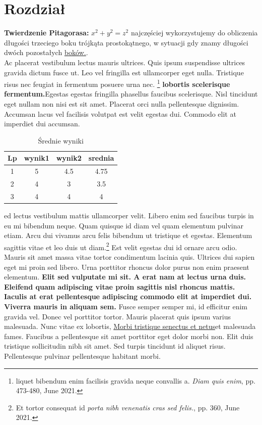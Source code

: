 \documentclass[12pt,a4paper]{article}
\begin{document}
	\section{Rozdział}
	\textbf{Twierdzenie Pitagorasa:} \(x^2 + y^2 = z^2\) najczęściej wykorzystujemy do obliczenia długości trzeciego boku trójkąta prostokątnego, w sytuacji gdy znamy długości dwóch pozostałych \underline{boków.}.
	\\Ac placerat vestibulum lectus mauris ultrices. Quis ipsum suspendisse ultrices gravida dictum fusce ut. Leo vel fringilla est ullamcorper eget nulla. Tristique risus nec feugiat in fermentum posuere urna nec. \footnote{liquet bibendum enim facilisis gravida neque convallis a. \emph{Diam quis enim}, pp. 473-480, June 2021.} \textbf{lobortis scelerisque fermentum.}Egestas egestas fringilla phasellus faucibus scelerisque. Nisl tincidunt eget nullam non nisi est sit amet. Placerat orci nulla pellentesque dignissim. Accumsan lacus vel facilisis volutpat est velit egestas dui. Commodo elit at imperdiet dui accumsan.
	\begin{table}[H]
		\centering
		\begin{tabular}{||c c c c||} 
			\hline
			Lp & wynik1 & wynik2 & srednia \\ [0.5ex] 
			\hline\hline
			1 & 5 & 4.5 & 4.75 \\ 
			\hline
			2 & 4 & 3 & 3.5 \\
			\hline
			3 & 4 & 4 & 4 \\ [1ex] 
			\hline
		\end{tabular}
	\caption{Średnie wyniki}
	\label{table: SrednieWyniki}
	\end{table}
	ed lectus vestibulum mattis ullamcorper velit. Libero enim sed faucibus turpis in eu mi bibendum neque. Quam quisque id diam vel quam elementum pulvinar etiam. Arcu dui vivamus arcu felis bibendum ut tristique et egestas. Elementum sagittis vitae et leo duis ut diam.\footnote{Et tortor consequat id \emph{porta nibh venenatis cras sed felis.}, pp. 360, June 2021.} Est velit egestas dui id ornare arcu odio. Mauris sit amet massa vitae tortor condimentum lacinia quis. Ultrices dui sapien eget mi proin sed libero. Urna porttitor rhoncus dolor purus non enim praesent elementum.  \textbf{Elit sed vulputate mi sit. A erat nam at lectus urna duis. Eleifend quam adipiscing vitae proin sagittis nisl rhoncus mattis. Iaculis at erat pellentesque adipiscing commodo elit at imperdiet dui. Viverra mauris in aliquam sem. } Fusce semper semper mi, id efficitur enim gravida vel. Donec vel porttitor tortor. Mauris placerat quis ipsum varius malesuada. Nunc vitae ex lobortis, \underline{Morbi tristique senectus et netus}et malesuada fames. Faucibus a pellentesque sit amet porttitor eget dolor morbi non. Elit duis tristique sollicitudin nibh sit amet. Sed turpis tincidunt id aliquet risus. Pellentesque pulvinar pellentesque habitant morbi.
\end{document}

